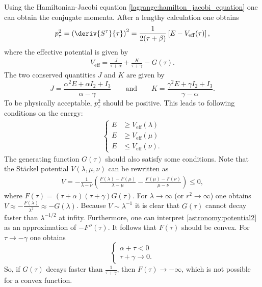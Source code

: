     Using the Hamiltonian-Jacobi equation \eqref{lagrange:hamilton_jacobi_equation} one can obtain the conjugate momenta. After a lengthy calculation one obtains
    \begin{gather}
        p_\tau^2 = \left(\deriv{S^\tau}{\tau}\right)^2 = \frac{1}{2(\tau+\beta)}\left[E - V_\mathrm{eff}(\tau)\right],
    \end{gather}
    where the effective potential is given by
    \begin{gather}
        V_\mathrm{eff} = \frac{J}{\tau+\alpha} + \frac{K}{\tau+\gamma} - G(\tau).
    \end{gather}
    The two conserved quantities $J$ and $K$ are given by \[J = \frac{\alpha^2E + \alpha I_2 + I_3}{\alpha - \gamma} \qquad\text{and}\qquad K = \frac{\gamma^2E + \gamma I_2 + I_3}{\gamma - \alpha}.\] To be physically acceptable, $p_\tau^2$ should be positive. This leads to following conditions on the energy:
    \begin{gather}
        \begin{cases}
            E&\geq V_\mathrm{eff}(\lambda)\\
            E&\geq V_\mathrm{eff}(\mu)\\
            E&\leq V_\mathrm{eff}(\nu).
        \end{cases}
    \end{gather}
    The generating function $G(\tau)$ should also satisfy some conditions. Note that the St\"ackel potential $V(\lambda,\mu,\nu)$ can be rewritten as
    \begin{gather}
        \label{astronomy:potential2}
        V = -\frac{1}{\lambda - \nu}\left(\frac{F(\lambda) - F(\mu)}{\lambda - \mu} - \frac{F(\mu) - F(\nu)}{\mu - \nu}\right) \leq 0,
    \end{gather}
    where $F(\tau) = (\tau + \alpha)(\tau + \gamma)G(\tau)$. For $\lambda\longrightarrow\infty$ (or $r^2\longrightarrow\infty$) one obtains $V\approx-\frac{F(\lambda)}{\lambda^2}\approx-G(\lambda)$. Because $V\sim \lambda^{-1}$ it is clear that $G(\tau)$ cannot decay faster than $\lambda^{-1/2}$ at infity. Furthermore, one can interpret \eqref{astronomy:potential2} as an approximation of $-F''(\tau)$. It follows that $F(\tau)$ should be convex. For $\tau\longrightarrow-\gamma$ one obtains \[\begin{cases}\alpha + \tau < 0\\\tau + \gamma\longrightarrow 0.\end{cases}\] So, if $G(\tau)$ decays faster than $\frac{1}{\tau + \gamma}$, then $F(\tau)\longrightarrow-\infty$, which is not possible for a convex function.

